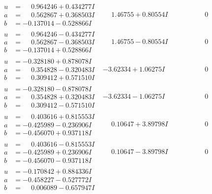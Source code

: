 \documentclass[1p]{elsarticle_modified}
\theoremstyle{definition}
\begin{document}
$$\begin{array}{c|c|c}
\begin{aligned}
u &= \phantom{-}0.964246 + 0.434277 I \\
a &= \phantom{-}0.562867 + 0.368503 I \\
b &= -0.137014 - 0.528866 I\end{aligned}
 & \phantom{-}1.46755 + 0.80554 I & \phantom{-0.000000 } 0 \\ \hline\begin{aligned}
u &= \phantom{-}0.964246 - 0.434277 I \\
a &= \phantom{-}0.562867 - 0.368503 I \\
b &= -0.137014 + 0.528866 I\end{aligned}
 & \phantom{-}1.46755 - 0.80554 I & \phantom{-0.000000 } 0 \\ \hline\begin{aligned}
u &= -0.328180 + 0.878078 I \\
a &= \phantom{-}0.354828 - 0.320483 I \\
b &= \phantom{-}0.309412 + 0.571510 I\end{aligned}
 & -3.62334 + 1.06275 I & \phantom{-0.000000 } 0 \\ \hline\begin{aligned}
u &= -0.328180 - 0.878078 I \\
a &= \phantom{-}0.354828 + 0.320483 I \\
b &= \phantom{-}0.309412 - 0.571510 I\end{aligned}
 & -3.62334 - 1.06275 I & \phantom{-0.000000 } 0 \\ \hline\begin{aligned}
u &= \phantom{-}0.403616 + 0.815553 I \\
a &= -0.425989 - 0.236906 I \\
b &= -0.456070 + 0.937118 I\end{aligned}
 & \phantom{-}0.10647 + 3.89798 I & \phantom{-0.000000 } 0 \\ \hline\begin{aligned}
u &= \phantom{-}0.403616 - 0.815553 I \\
a &= -0.425989 + 0.236906 I \\
b &= -0.456070 - 0.937118 I\end{aligned}
 & \phantom{-}0.10647 - 3.89798 I & \phantom{-0.000000 } 0 \\ \hline\begin{aligned}
u &= -0.170842 + 0.884336 I \\
a &= -0.458227 - 0.527772 I \\
b &= \phantom{-}0.006089 - 0.657947 I\end{aligned}

\end{array}$$
\end{document}
